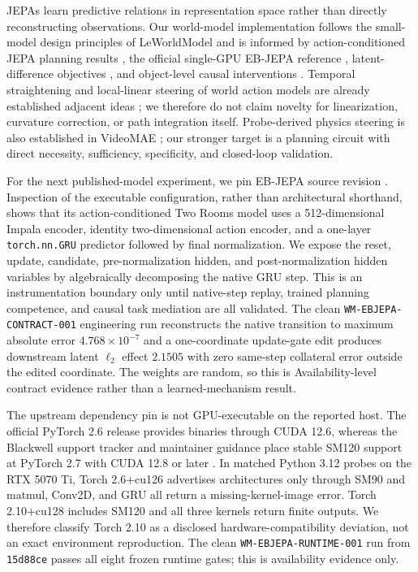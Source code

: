 \documentclass[10pt]{article}
\newcommand{\code}[1]{\texttt{#1}}
\begin{document}
JEPAs learn predictive relations in representation space rather than directly
reconstructing observations.  Our world-model implementation follows the
small-model design principles of LeWorldModel \cite{maes2026leworldmodel} and
is informed by action-conditioned JEPA planning results
\cite{terver2025jepawms}, the official single-GPU EB-JEPA reference
\cite{terver2026ebjepa}, latent-difference objectives
\cite{zhang2026deltajepa}, and object-level causal interventions
\cite{nam2026causaljepa}.  Temporal straightening and local-linear steering of
world action models are already established adjacent ideas
\cite{wang2026straightening,hong2026wamsteering}; we therefore do not claim
novelty for linearization, curvature correction, or path integration itself.
Probe-derived physics steering is also established in VideoMAE
\cite{alam2026physicssteering}; our stronger target is a planning circuit with
direct necessity, sufficiency, specificity, and closed-loop validation.

For the next published-model experiment, we pin EB-JEPA source revision
\texttt{}.  Inspection of the executable
configuration, rather than architectural shorthand, shows that its
action-conditioned Two Rooms model uses a 512-dimensional Impala encoder,
identity two-dimensional action encoder, and a one-layer \code{torch.nn.GRU}
predictor followed by final normalization.  We expose the reset, update,
candidate, pre-normalization hidden, and post-normalization hidden variables by
algebraically decomposing the native GRU step.  This is an instrumentation
boundary only until native-step replay, trained planning competence, and causal
task mediation are all validated.  The clean \code{WM-EBJEPA-CONTRACT-001}
engineering run reconstructs the native transition to maximum absolute error
$4.768\times10^{-7}$ and a one-coordinate update-gate edit produces downstream
latent $\ell_2$ effect $2.1505$ with zero same-step collateral error outside
the edited coordinate.  The weights are random, so this is Availability-level
contract evidence rather than a learned-mechanism result.

The upstream dependency pin is not GPU-executable on the reported host.  The
official PyTorch 2.6 release provides binaries through CUDA 12.6, whereas the
Blackwell support tracker and maintainer guidance place stable SM120 support at
PyTorch 2.7 with CUDA 12.8 or later
\cite{pytorch2025v26,pytorch2025blackwell}.  In matched Python 3.12 probes on
the RTX 5070 Ti, Torch 2.6+cu126 advertises architectures only through SM90 and
matmul, Conv2D, and GRU all return a missing-kernel-image error.  Torch
2.10+cu128 includes SM120 and all three kernels return finite outputs.  We
therefore classify Torch 2.10 as a disclosed hardware-compatibility deviation,
not an exact environment reproduction.  The clean
\code{WM-EBJEPA-RUNTIME-001} run from \code{15d88ce} passes all eight frozen
runtime gates; this is availability evidence only.
\end{document}
